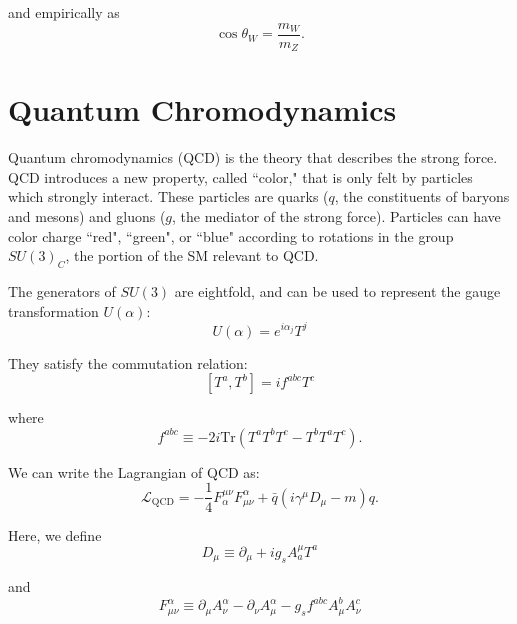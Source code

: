 \noindent and empirically as~\cite{halzen}
\begin{equation}
\cos \theta_{W} = \frac{m_{W}}{m_{Z}}.
\end{equation}

\section{Quantum Chromodynamics}

Quantum chromodynamics (QCD) is the theory that describes the strong force. QCD introduces a new property, called ``color," that is only felt by particles which strongly interact. These particles are quarks ($q$, the constituents of baryons and mesons) and gluons ($g$, the mediator of the strong force). Particles can have color charge ``red", ``green", or ``blue" according to rotations in the group $SU(3)_{C}$, the portion of the SM relevant to QCD.

The generators of $SU(3)$ are eightfold, and can be used to represent the gauge transformation $U(\alpha)$:
\begin{equation}
U(\alpha) = e^{i\alpha_{j}}T^{j}
\end{equation}

\noindent They satisfy the commutation relation:
\begin{equation}
\left[T^{a}, T^{b}\right] = if^{abc}T^{c}
\end{equation}

\noindent where 
\begin{equation}
f^{abc} \equiv -2i\text{Tr}\left(T^{a}T^{b}T^{c} - T^{b}T^{a}T^{c}\right).
\end{equation}

\noindent We can write the Lagrangian of QCD as:\cite{halzen}
\begin{equation}
\mathcal{L}_{\text{QCD}} = -\frac{1}{4}F^{\mu\nu}_{\alpha}F^{\alpha}_{\mu\nu} + \bar{q}\left(i\gamma^{\mu}D_{\mu} - m\right)q.
\end{equation}

\noindent Here, we define
\begin{equation}
D_{\mu} \equiv \partial_{\mu} + ig_{s}A^{\mu}_{a}T^{a}
\end{equation}

\noindent and
\begin{equation}
F^{\alpha}_{\mu\nu} \equiv \partial_{\mu}A^{\alpha}_{\nu} - \partial_{\nu}A^{\alpha}_{\mu} - g_{s}f^{abc}A^{b}_{\mu}A^{c}_{\nu}
\end{equation}

